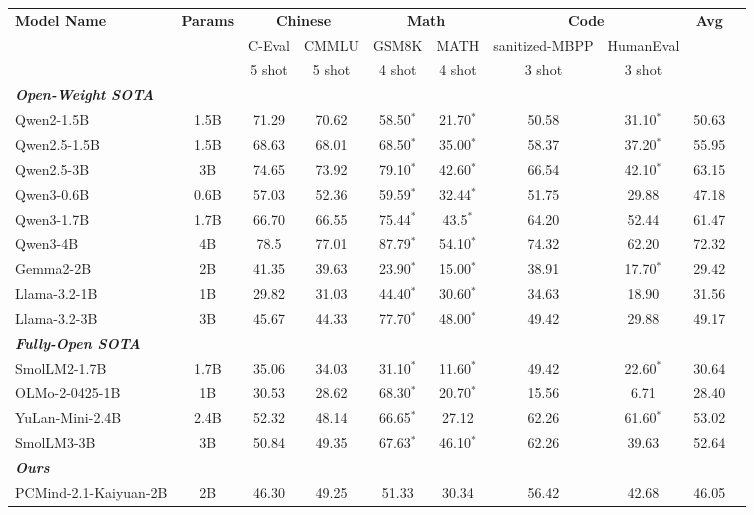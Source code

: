 \begin{tabular}{lccccccccc}
\toprule
\multirow{3}{*}{\textbf{Model Name}} & \multirow{3}{*}{\textbf{Params}} & \multicolumn{2}{c}{\textbf{Chinese}} & \multicolumn{2}{c}{\textbf{Math}} & \multicolumn{2}{c}{\textbf{Code}} & \multirow{3}{*}{\textbf{Avg}}\\
\cmidrule(lr){3-4} \cmidrule(lr){5-6} \cmidrule(lr){7-8}
 &  & C-Eval & CMMLU  & GSM8K & MATH & sanitized-MBPP & HumanEval & \\
 &  & 5 shot & 5 shot & 4 shot & 4 shot & 3 shot & 3 shot & \\
\midrule

\multicolumn{9}{l}{\textit{\textbf{Open-Weight SOTA}}} \\
\rowcolor{openweight} Qwen2-1.5B & 1.5B & 71.29 & 70.62 & 58.50$^{*}$ & 21.70$^{*}$ & 50.58 & 31.10$^{*}$ & 50.63\\
\rowcolor{openweight} Qwen2.5-1.5B & 1.5B & 68.63 & 68.01  & 68.50$^{*}$ & 35.00$^{*}$ & 58.37 & 37.20$^{*}$ & 55.95\\
\rowcolor{openweight} Qwen2.5-3B & 3B & 74.65 & 73.92  & 79.10$^{*}$ & 42.60$^{*}$ & 66.54 & 42.10$^{*}$ & 63.15\\
\rowcolor{openweight} Qwen3-0.6B & 0.6B & 57.03 & 52.36 & 59.59$^{*}$ & 32.44$^{*}$ & 51.75	 & 29.88 & 47.18 \\
\rowcolor{openweight} Qwen3-1.7B & 1.7B & 66.70 & 66.55  & 75.44$^{*}$ & 43.5$^{*}$ & 64.20 & 52.44 & 61.47\\
\rowcolor{openweight} Qwen3-4B & 4B & 78.5 & 77.01 & 87.79$^{*}$ & 54.10$^{*}$ & 74.32 & 62.20 & 72.32\\
\rowcolor{openweight} Gemma2-2B & 2B & 41.35 & 39.63 & 23.90$^{*}$ & 15.00$^{*}$ & 38.91 & 17.70$^{*}$ & 29.42\\
\rowcolor{openweight} Llama-3.2-1B & 1B & 29.82 & 31.03 & 44.40$^{*}$ & 30.60$^{*}$ & 34.63 & 18.90 & 31.56\\
\rowcolor{openweight} Llama-3.2-3B & 3B & 45.67 & 44.33 & 77.70$^{*}$ & 48.00$^{*}$ & 49.42 & 29.88 & 49.17\\

\multicolumn{9}{l}{\textit{\textbf{Fully-Open SOTA}}} \\
\rowcolor{fullyopen} SmolLM2-1.7B & 1.7B & 35.06 & 34.03 & 31.10$^{*}$ & 11.60$^{*}$ & 49.42 & 22.60$^{*}$ & 30.64\\
\rowcolor{fullyopen} OLMo-2-0425-1B & 1B & 30.53 & 28.62 & 68.30$^{*}$ & 20.70$^{*}$ & 15.56 & 6.71 & 28.40\\
\rowcolor{fullyopen} YuLan-Mini-2.4B & 2.4B & 52.32 & 48.14 & 66.65$^{*}$ & 27.12 & 62.26 & 61.60$^{*}$ & 53.02\\
\rowcolor{fullyopen} SmolLM3-3B & 3B & 50.84 & 49.35 & 67.63$^{*}$ & 46.10$^{*}$	& 62.26 & 39.63 & 52.64\\

\multicolumn{9}{l}{\textit{\textbf{Ours}}} \\
\rowcolor{ours} PCMind-2.1-Kaiyuan-2B & 2B & 46.30 & 49.25 & 51.33 & 30.34 & 56.42 & 42.68 & 46.05\\

\bottomrule
\end{tabular}%
